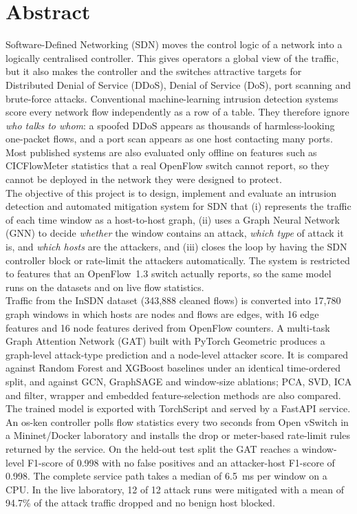 \chapter*{Abstract}
\thispagestyle{plain}
Software-Defined Networking (SDN) moves the control logic of a network into a logically centralised controller. This gives operators a global view of the traffic, but it also makes the controller and the switches attractive targets for Distributed Denial of Service (DDoS), Denial of Service (DoS), port scanning and brute-force attacks. Conventional machine-learning intrusion detection systems score every network flow independently as a row of a table. They therefore ignore \emph{who talks to whom}: a spoofed DDoS appears as thousands of harmless-looking one-packet flows, and a port scan appears as one host contacting many ports. Most published systems are also evaluated only offline on features such as CICFlowMeter statistics that a real OpenFlow switch cannot report, so they cannot be deployed in the network they were designed to protect.\\

The objective of this project is to design, implement and evaluate an intrusion detection and automated mitigation system for SDN that (i) represents the traffic of each time window as a host-to-host graph, (ii) uses a Graph Neural Network (GNN) to decide \emph{whether} the window contains an attack, \emph{which type} of attack it is, and \emph{which hosts} are the attackers, and (iii) closes the loop by having the SDN controller block or rate-limit the attackers automatically. The system is restricted to features that an OpenFlow~1.3 switch actually reports, so the same model runs on the datasets and on live flow statistics.\\

Traffic from the InSDN dataset (343,888 cleaned flows) is converted into 17,780 graph windows in which hosts are nodes and flows are edges, with 16 edge features and 16 node features derived from OpenFlow counters. A multi-task Graph Attention Network (GAT) built with PyTorch Geometric produces a graph-level attack-type prediction and a node-level attacker score. It is compared against Random Forest and XGBoost baselines under an identical time-ordered split, and against GCN, GraphSAGE and window-size ablations; PCA, SVD, ICA and filter, wrapper and embedded feature-selection methods are also compared. The trained model is exported with TorchScript and served by a FastAPI service. An os-ken controller polls flow statistics every two seconds from Open vSwitch in a Mininet/Docker laboratory and installs the drop or meter-based rate-limit rules returned by the service. On the held-out test split the GAT reaches a window-level F1-score of 0.998 with no false positives and an attacker-host F1-score of 0.998. The complete service path takes a median of 6.5~ms per window on a CPU. In the live laboratory, 12 of 12 attack runs were mitigated with a mean of 94.7\% of the attack traffic dropped and no benign host blocked.\\

